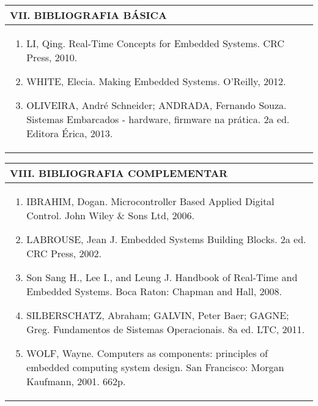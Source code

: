 \documentclass[12pt]{article}
\begin{document}


\begin{longtable}{|L{1.025\textwidth}|} \hline
%
{\bf VII. BIBLIOGRAFIA BÁSICA} \\ \hline
\begin{enumerate}
\item LI, Qing. Real-Time Concepts for Embedded Systems. CRC Press, 2010. 
\item WHITE, Elecia. Making Embedded Systems. O'Reilly, 2012. 
\item OLIVEIRA, André Schneider; ANDRADA, Fernando Souza. Sistemas Embarcados - hardware, firmware na prática. 2a ed. Editora Érica, 2013.
\end{enumerate}
 \\ \hline
\end{longtable}


\newpage

\begin{longtable}{|L{1.025\textwidth}|} \hline
%
{\bf VIII. BIBLIOGRAFIA COMPLEMENTAR} \\ \hline
\begin{enumerate}
\item  IBRAHIM, Dogan. Microcontroller Based Applied Digital Control. John Wiley \& Sons Ltd, 2006. 
\item LABROUSE, Jean J. Embedded Systems Building Blocks. 2a ed. CRC Press, 2002. 
\item Son Sang H., Lee I., and Leung J. Handbook of Real-Time and Embedded Systems. Boca Raton: Chapman and Hall, 2008. 
\item SILBERSCHATZ, Abraham; GALVIN, Peter Baer; GAGNE; Greg. Fundamentos de Sistemas Operacionais. 8a ed. LTC, 2011. 
\item WOLF, Wayne. Computers as components: principles of embedded computing system design. San Francisco: Morgan Kaufmann, 2001. 662p.

%
\end{enumerate}
 \\ \hline
\end{longtable}



\end{document}
